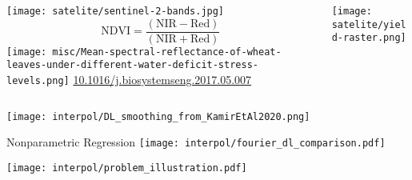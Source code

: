 

\begin{frame}
    \begin{columns}
        \begin{column}{0.6\textwidth}
            \begin{center}
                \texttt{[image: satelite/sentinel-2-bands.jpg]}
                $$\mathrm{NDVI}=\frac{(\mathrm{NIR}-\mathrm{Red})}{(\mathrm{NIR}+\mathrm{Red})}$$
                \texttt{[image: misc/Mean-spectral-reflectance-of-wheat-leaves-under-different-water-deficit-stress-levels.png]}
                \tiny \url{10.1016/j.biosystemseng.2017.05.007}
            \end{center}
        \end{column}
        \begin{column}{0.35\textwidth}  %
            \begin{center}
                \texttt{[image: satelite/yield-raster.png]}
            \end{center}
        \end{column}
    \end{columns}
\end{frame}



\begin{frame}
    \begin{center}
        \texttt{[image: interpol/DL\_smoothing\_from\_KamirEtAl2020.png]}
    \end{center}
\end{frame}

\begin{frame}[fragile]{Nonparametric Regression}
    \texttt{[image: interpol/fourier\_dl\_comparison.pdf]}
\end{frame}

\begin{frame}
    \texttt{[image: interpol/problem\_illustration.pdf]}
\end{frame}


\begin{frame}[fragile]

    \vspace{-1cm}
    \tiny
    
    \normalsize
\end{frame}


